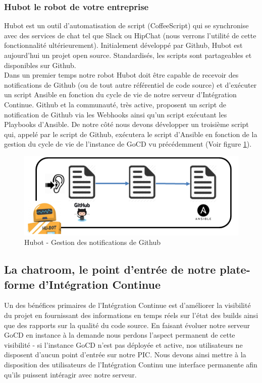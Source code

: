           \subsubsection{Hubot le robot de votre entreprise}\label{Hubot}
          Hubot est un outil d'automatisation de script (CoffeeScript) qui se synchronise avec des services de chat tel que Slack ou HipChat (nous verrons l'utilité de cette fonctionnalité ultérieurement). Initialement développé par Github, Hubot est aujourd'hui un projet open source. Standardisés, les scripts sont partageables et disponibles sur Github.\\

          Dans un premier temps notre robot Hubot doit être capable de recevoir des notifications de Github (ou de tout autre référentiel de code source) et d'exécuter un script Ansible en fonction du cycle de vie de notre serveur d'Intégration Continue. Github et la communauté, très active, proposent un script de notification de Github via les Webhooks ainsi qu'un script exécutant les Playbooks d'Ansible. De notre côté nous devons développer un troisième script qui, appelé par le script de Github, exécutera le script d'Ansible en fonction de la gestion du cycle de vie de l'instance de GoCD vu précédemment (Voir figure \ref{HubotScripts1}).\\

          \begin{figure}
            \begin{center}
              \includegraphics[scale=0.7]{images/HubotScripts1.png}
            \end{center}
            \caption{Hubot - Gestion des notifications de Github}
            \label{HubotScripts1}
          \end{figure}

      \subsection{La chatroom, le point d'entrée de notre plate-forme d'Intégration Continue}
      Un des bénéfices primaires de l'Intégration Continue est d'améliorer la visibilité du projet en fournissant des informations en temps réels sur l'état des builds ainsi que des rapports sur la qualité du code source. En faisant évoluer notre serveur GoCD en instance à la demande nous perdons l'aspect permanent de cette visibilité - si l'instance GoCD n'est pas déployée et active, nos utilisateurs ne disposent d'aucun point d'entrée sur notre PIC. Nous devons ainsi mettre à la disposition des utilisateurs de l'Intégration Continu une interface permanente afin qu'ils puissent intéragir avec notre serveur.\\

